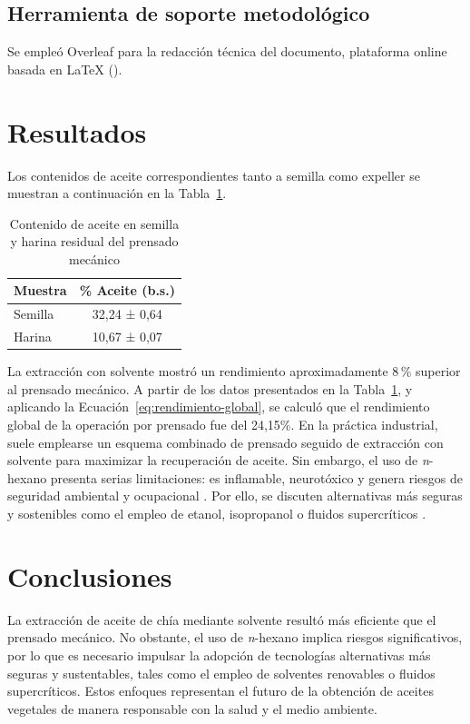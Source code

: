 \documentclass[12pt,a4paper]{article}
\begin{document}
\subsection{Herramienta de soporte metodológico}

Se empleó Overleaf para la redacción técnica del documento, plataforma online basada en LaTeX (\citet{palma2023ciencia}). 


\section{Resultados}

Los contenidos de aceite correspondientes tanto a semilla como expeller se muestran a continuación en la Tabla~\ref{tbl:aceite}.

\begin{table}[H]
\centering
\caption{Contenido de aceite en semilla y harina residual del prensado mecánico}
\label{tbl:aceite}
\begin{tabular}{lc}
\toprule
\textbf{Muestra} & \textbf{\% Aceite (b.s.)} \\
\midrule
Semilla & 32,24 ± 0,64 \\
Harina  & 10,67 ± 0,07 \\
\bottomrule
\end{tabular}
\end{table}

La extracción con solvente mostró un rendimiento aproximadamente 8\,\% superior al prensado mecánico. A partir de los datos presentados en la Tabla~\ref{tbl:aceite}, y aplicando la Ecuación~\ref{eq:rendimiento-global}, se calculó que el rendimiento global de la operación por prensado fue del 24,15\%.
En la práctica industrial, suele emplearse un esquema combinado de prensado seguido de extracción con solvente para maximizar la recuperación de aceite. Sin embargo, el uso de \textit{n}-hexano presenta serias limitaciones: es inflamable, neurotóxico y genera riesgos de seguridad ambiental y ocupacional \citep{quimica_sostenible_2011}. Por ello, se discuten alternativas más seguras y sostenibles como el empleo de etanol, isopropanol o fluidos supercríticos \citep{rodriguez_2019, tornero_2015}.

\section{Conclusiones}

La extracción de aceite de chía mediante solvente resultó más eficiente que el prensado mecánico. No obstante, el uso de \textit{n}-hexano implica riesgos significativos, por lo que es necesario impulsar la adopción de tecnologías alternativas más seguras y sustentables, tales como el empleo de solventes renovables o fluidos supercríticos. Estos enfoques representan el futuro de la obtención de aceites vegetales de manera responsable con la salud y el medio ambiente.
\end{document}
